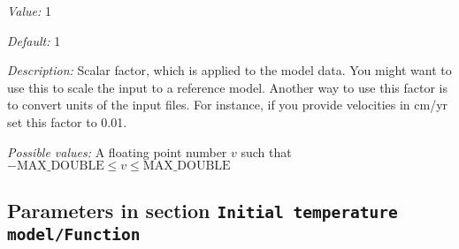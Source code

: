 \begin{itemize}
{\it Value:} 1


{\it Default:} 1


{\it Description:} Scalar factor, which is applied to the model data. You might want to use this to scale the input to a reference model. Another way to use this factor is to convert units of the input files. For instance, if you provide velocities in cm/yr set this factor to 0.01.


{\it Possible values:} A floating point number $v$ such that $-\text{MAX\_DOUBLE} \leq v \leq \text{MAX\_DOUBLE}$
\end{itemize}

\subsection{Parameters in section \tt Initial temperature model/Function}
\label{parameters:Initial_20temperature_20model/Function}

